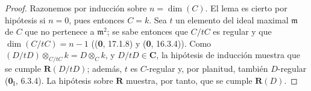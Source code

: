 \begin{proof}
Razonemos por inducción sobre $n=\dim(C)$. El lema es cierto por hipótesis
si $n=0$, pues entonces $C=k$. Sea $t$ un elemento del ideal maximal
$\mathfrak m$ de $C$ que no pertenece a $\mathfrak m^2$; se sabe entonces que
$C/tC$ es regular y que $\dim(C/tC)=n-1$ ((\textbf 0, 17.1.8) y (\textbf 0, 16.3.4)).
Como
$(D/tD)\otimes_{C/tC}k=D\otimes_C k$,
y $D/tD\in\boldsymbol{C}$, la hipótesis de inducción muestra que se cumple
$\boldsymbol R(D/tD)$; además, $t$ es $C$-regular y, por planitud,
también $D$-regular (\textbf 0$_{\mathrm I}$, 6.3.4). La hipótesis sobre
$\boldsymbol R$ muestra, por tanto, que se cumple $\boldsymbol R(D)$.
\end{proof}
